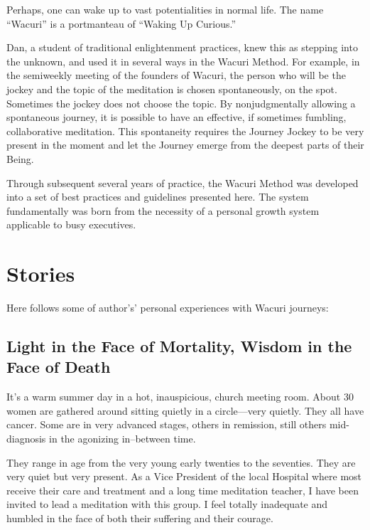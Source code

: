\documentclass[12pt]{book}
\begin{document}
Perhaps, one can wake up to vast potentialities in normal life. The name ``Wacuri'' is a portmanteau of ``Waking Up Curious.''
					
Dan, a student of traditional enlightenment practices, knew this as stepping into the unknown, and used it in several ways in the Wacuri Method. For example, in the semiweekly meeting of the founders of Wacuri, the person who will be the jockey and the topic of the meditation is chosen spontaneously, on the spot. Sometimes the jockey does not choose the topic. By nonjudgmentally allowing a spontaneous journey, it is possible to have an effective, if sometimes fumbling, collaborative meditation. This spontaneity requires the Journey Jockey to be very present in the moment and let the Journey emerge from the deepest parts of their Being.
					
Through subsequent several years of practice, the Wacuri Method was developed into a set of best practices and guidelines presented here. The system fundamentally was born from the necessity of a personal growth system applicable to busy executives.
				
			
	

\chapter{Stories}

Here follows some of author's’ personal experiences with Wacuri journeys:

\section{Light in the Face of Mortality, Wisdom in the Face of Death}
					


It's a warm summer day in a hot, inauspicious, church meeting
room. About 30 women are gathered around sitting quietly in a
circle---very quietly. They all have cancer. Some are in very advanced
stages, others in remission, still others mid-diagnosis in the
agonizing in--between time.

They range in age from the very young early twenties to the
seventies. They are very quiet but very present. As a Vice President
of the local Hospital where most receive their care and treatment and
a long time meditation teacher, I have been invited to lead a
meditation with this group. I feel totally inadequate and humbled in
the face of both their suffering and their courage.
\end{document}
